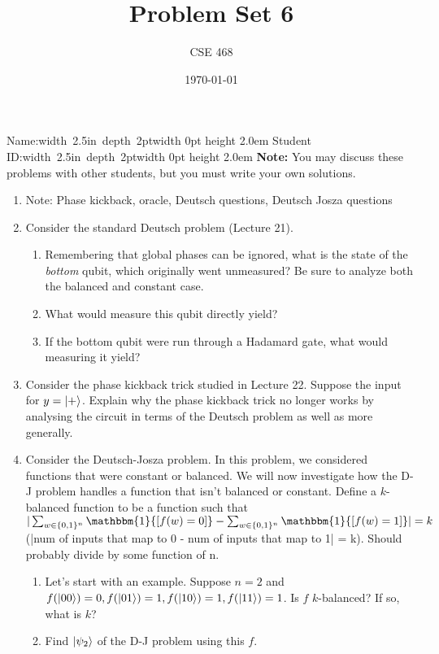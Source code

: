 \documentclass[12pt]{article}
\title{Problem Set 6}
\author{CSE 468}
\date{\today}
\newcommand{\NameBlank}{\mbox{\hskip 4pt\vrule width 2.5in depth 2pt}\vrule width 0pt height 2.0em}
\begin{document}
\maketitle

\noindent Name:\NameBlank{} \newline
\noindent Student ID:\NameBlank{} \newline
\textbf{Note:} You may discuss these problems with other students, but you must write your own solutions.

\begin{enumerate}[font=\bfseries]

    \item Note: Phase kickback, oracle, Deutsch questions, Deutsch Josza questions
    \item Consider the standard Deutsch problem (Lecture 21).
    \begin{enumerate}
        \item Remembering that global phases can be ignored, what is the state of the \emph{bottom} qubit, which originally went unmeasured? Be sure to analyze both the balanced and constant case.
        \item What would measure this qubit directly yield?
        \item If the bottom qubit were run through a Hadamard gate, what would measuring it yield?
    \end{enumerate}
    \item Consider the phase kickback trick studied in Lecture 22. Suppose the input for $y = \ket{+}$. Explain why the phase kickback trick no longer works by analysing the circuit in terms of the Deutsch problem as well as more generally.
    \item Consider the Deutsch-Josza problem. In this problem, we considered functions that were constant or balanced. We will now investigate how the D-J problem handles a function that isn't balanced or constant. Define a $k$-balanced function to be a function such that $|\sum_{w\in\{0,1\}^n} \mathbbm{1}{[f(w) = 0]} - \sum_{w\in\{0,1\}^n} \mathbbm{1}{[f(w) = 1]}| = k$ (|num of inputs that map to 0 - num of inputs that map to 1| = k). Should probably divide by some function of n.
    \begin{enumerate}
        \item Let's start with an example. Suppose $n = 2$ and $f(\ket{00}) = 0, f(\ket{01}) = 1, f(\ket{10}) = 1, f(\ket{11}) = 1$. Is $f$ $k$-balanced? If so, what is $k$?
        \item Find $\ket{\psi_2}$ of the D-J problem using this $f$.

\end{enumerate}
\end{enumerate}
\end{document}
